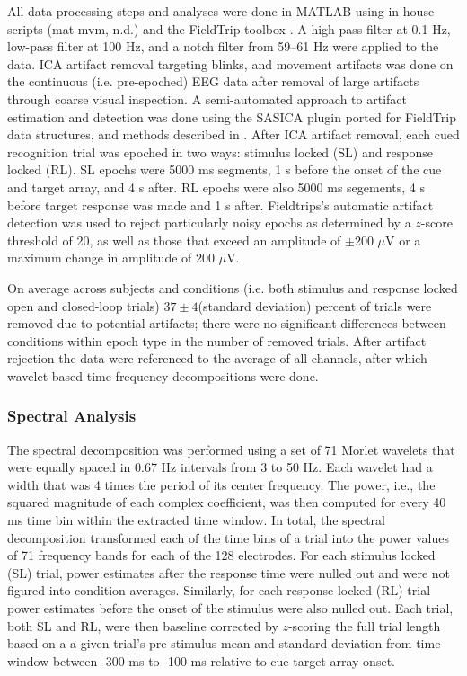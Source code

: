 \documentclass[11pt, titlepage, twoside]{article}
\begin{document}
All data processing steps and analyses were done in MATLAB using in-house scripts (mat-mvm, n.d.) and the FieldTrip toolbox \cite{OostenveldFriesMarisEtAl11}. A high-pass filter at 0.1 Hz, low-pass filter at 100 Hz, and a notch filter from 59--61 Hz were applied to the data.  ICA artifact removal targeting blinks, and movement artifacts was done on the continuous (i.e. pre-epoched) EEG data after removal of large artifacts through coarse visual inspection.  A semi-automated approach to artifact estimation and detection was done using the SASICA plugin ported for FieldTrip data structures, and methods described in \textcite{ChaumonBishopBusch15}.  After ICA artifact removal, each cued recognition trial was epoched in two ways: stimulus locked (SL) and response locked (RL).  SL epochs were 5000 ms segments, 1 s before the onset of the cue and target array, and 4 s after. RL epochs were also 5000 ms segements, 4 s before target response was made and 1 s after.  Fieldtrips's automatic artifact detection was used to reject particularly noisy epochs as determined by a $z$-score threshold of 20, as well as those that exceed an amplitude of $\pm$200 $\mu$V or a maximum change in amplitude of 200 $\mu$V. 

On average across subjects and conditions (i.e. both stimulus and response locked open and closed-loop trials) $37\pm4$(standard deviation) percent of trials were removed due to potential artifacts; there were no significant differences between conditions within epoch type in the number of removed trials.  After artifact rejection the data were referenced to the average of all channels, after which wavelet based time frequency decompositions were done.

\subsubsection{Spectral Analysis}
\label{sec:deevSpecAnal}
The spectral decomposition was performed using a set of 71 Morlet wavelets that were equally spaced in 0.67 Hz intervals from 3 to 50 Hz. Each wavelet had a width that was 4 times the period of its center frequency. The power, i.e., the squared magnitude of each complex coefficient, was then computed for every 40 ms time bin within the extracted time window. In total, the spectral decomposition transformed each of the time bins of a trial into the power values of 71 frequency bands for each of the 128 electrodes.  For each stimulus locked (SL) trial, power estimates after the response time were nulled out and were not figured into condition averages.  Similarly, for each response locked (RL) trial power estimates before the onset of the stimulus were also nulled out.  Each trial, both SL and RL, were then baseline corrected by $z$-scoring the full trial length based on a a given trial's pre-stimulus mean and standard deviation from time window between -300 ms to -100 ms relative to cue-target array onset.  
\end{document}
